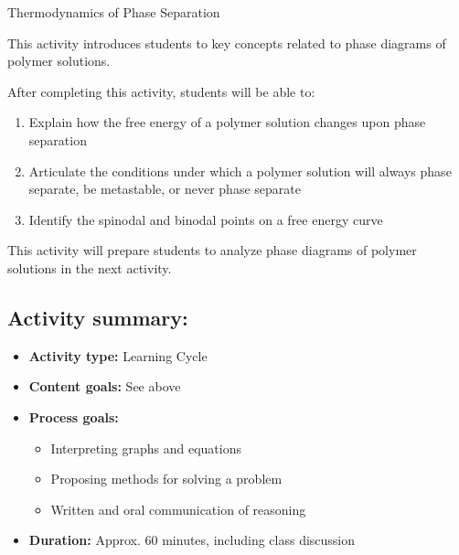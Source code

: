 %
%
%
%

\renewcommand{\figpath}{content/polymphys/solution-thermo/phase-sep/figs}
\renewcommand{\labelbase}{phase-sep}

\begin{activity}{Thermodynamics of Phase Separation}

\begin{instructornotes}

	This activity introduces students to key concepts related to phase diagrams of polymer solutions.
	
	After completing this activity, students will be able to:
			\begin{enumerate}
				\item Explain how the free energy of a polymer solution changes upon phase separation
				\item Articulate the conditions under which a polymer solution will always phase separate, be metastable, or never phase separate
				\item Identify the spinodal and binodal points on a free energy curve
			\end{enumerate}
			
	This activity will prepare students to analyze phase diagrams of polymer solutions in the next activity.
			
	\subsection*{Activity summary:}
	\begin{itemize}
		\item \textbf{Activity type:} Learning Cycle
		\item \textbf{Content goals:} See above %
		\item \textbf{Process goals:} %
			\begin{itemize}
				\item Interpreting graphs and equations
				\item Proposing methods for solving a problem
				\item Written and oral communication of reasoning
			\end{itemize}
		\item \textbf{Duration:} Approx. 60 minutes, including class discussion
		

\end{itemize}
\end{instructornotes}
\end{activity}
